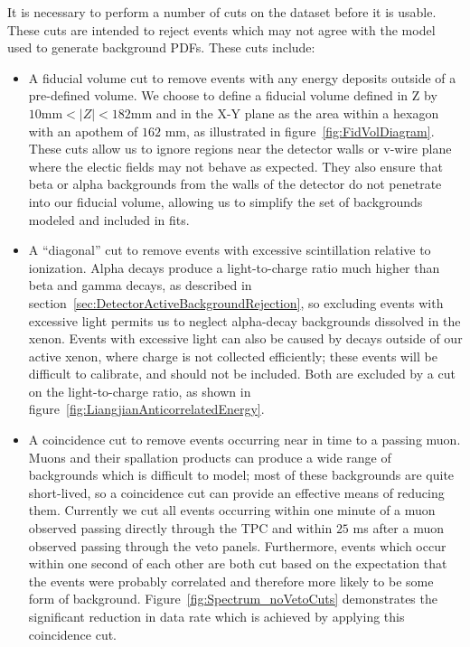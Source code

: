 It is necessary to perform a number of cuts on the dataset before it is usable.  These cuts are intended to reject events which may not agree with the model used to generate background PDFs.  These cuts include:~\cite{FittingDocument}
\begin{itemize}
\item A fiducial volume cut to remove events with any energy deposits outside of a pre-defined volume.  We choose to define a fiducial volume defined in Z by $10 \text{mm} < |Z| < 182 \text{mm}$ and in the X-Y plane as the area within a hexagon with an apothem of $162$ mm, as illustrated in figure~\ref{fig:FidVolDiagram}.  These cuts allow us to ignore regions near the detector walls or v-wire plane where the electic fields may not behave as expected.  They also ensure that beta or alpha backgrounds from the walls of the detector do not penetrate into our fiducial volume, allowing us to simplify the set of backgrounds modeled and included in fits.
\item A ``diagonal'' cut to remove events with excessive scintillation relative to ionization.  Alpha decays produce a light-to-charge ratio much higher than beta and gamma decays, as described in section~\ref{sec:DetectorActiveBackgroundRejection}, so excluding events with excessive light permits us to neglect alpha-decay backgrounds dissolved in the xenon.  Events with excessive light can also be caused by decays outside of our active xenon, where charge is not collected efficiently; these events will be difficult to calibrate, and should not be included.  Both are excluded by a cut on the light-to-charge ratio, as shown in figure~\ref{fig:LiangjianAnticorrelatedEnergy}.
\item A coincidence cut to remove events occurring near in time to a passing muon.  Muons and their spallation products can produce a wide range of backgrounds which is difficult to model; most of these backgrounds are quite short-lived, so a coincidence cut can provide an effective means of reducing them.  Currently we cut all events occurring within one minute of a muon observed passing directly through the TPC and within $25$ ms after a muon observed passing through the veto panels.  Furthermore, events which occur within one second of each other are both cut based on the expectation that the events were probably correlated and therefore more likely to be some form of background.  Figure~\ref{fig:Spectrum_noVetoCuts} demonstrates the significant reduction in data rate which is achieved by applying this coincidence cut.
\end{itemize}

